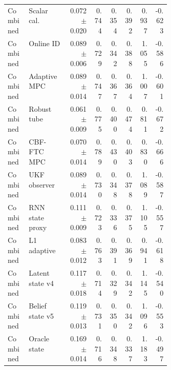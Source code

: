 \documentclass{article}
\begin{document}
\begin{center}
\begin{longtable}{p{0.13\linewidth}p{0.24\linewidth}rrrrrr}
Combined & Scalar cal. & 0.072 $\pm$ 0.020 & 0.744 & 0.354 & 0.392 & 0.937 & -0.623\\
Combined & Online ID & 0.089 $\pm$ 0.006 & 0.729 & 0.342 & 0.388 & 1.055 & -0.586\\
Combined & Adaptive MPC & 0.089 $\pm$ 0.014 & 0.747 & 0.367 & 0.364 & 1.007 & -0.601\\
Combined & Robust tube & 0.061 $\pm$ 0.009 & 0.775 & 0.400 & 0.474 & 0.811 & -0.672\\
Combined & CBF-FTC MPC & 0.070 $\pm$ 0.014 & 0.789 & 0.430 & 0.403 & 0.830 & -0.666\\
Combined & UKF observer & 0.089 $\pm$ 0.014 & 0.730 & 0.348 & 0.378 & 1.089 & -0.587\\
Combined & RNN state proxy & 0.111 $\pm$ 0.009 & 0.723 & 0.336 & 0.375 & 1.105 & -0.557\\
Combined & L1 adaptive & 0.083 $\pm$ 0.012 & 0.763 & 0.391 & 0.369 & 0.941 & -0.618\\
Combined & Latent state v4 & 0.117 $\pm$ 0.018 & 0.714 & 0.329 & 0.342 & 1.145 & -0.540\\
Combined & Belief state v5 & 0.119 $\pm$ 0.013 & 0.731 & 0.350 & 0.342 & 1.096 & -0.553\\
Combined & Oracle state & 0.169 $\pm$ 0.014 & 0.716 & 0.348 & 0.337 & 1.183 & -0.497\\
\bottomrule
\end{longtable}
\normalsize
\end{center}
\end{document}
